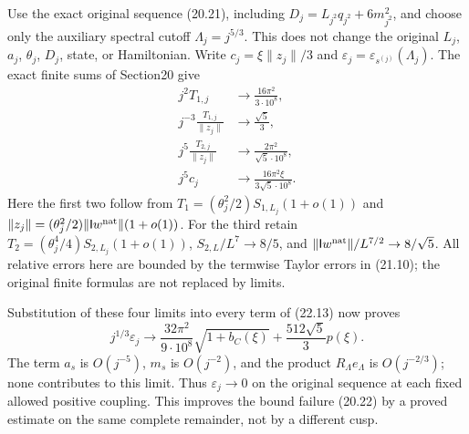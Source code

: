 \documentclass[
]{article}
\begin{document}
Use the exact original sequence (20.21), including
\(D_j=L_{j^2}q_{j^2}+6m_{j^2}^2\), and choose only the auxiliary
spectral cutoff \(\Lambda_j=j^{5/3}\). This does not change the original
\(L_j\), \(a_j\), \(\theta_j\), \(D_j\), state, or Hamiltonian. Write
\(c_j=\xi\|z_j\|/3\) and
\(\varepsilon_j=\varepsilon_{s^{(j)}}(\Lambda_j)\). The exact finite
sums of Section20 give \[
\begin{aligned}
j^2T_{1,j}&\longrightarrow\frac{16\pi^2}{3\cdot10^8},\\
j^{-3}\frac{T_{1,j}}{\|z_j\|}&\longrightarrow\frac{\sqrt5}{3},\\
j^5\frac{T_{2,j}}{\|z_j\|}&\longrightarrow\frac{2\pi^2}{\sqrt5\cdot10^8},\\
j^5c_j&\longrightarrow\frac{16\pi^2\xi}{3\sqrt5\cdot10^8}.
\end{aligned}                                                   \tag{22.15}
\] Here the first two follow from
\(T_1=(\theta_j^2/2)S_{1,L_j}(1+o(1))\) and
\(\|z_j\|=(\theta_j^2/2)\|\mathsf Iw^{\rm nat}\|(1+o(1))\). For the
third retain \(T_2=(\theta_j^4/4)S_{2,L_j}(1+o(1))\),
\(S_{2,L}/L^7\to8/5\), and
\(\|\mathsf Iw^{\rm nat}\|/L^{7/2}\to8/\sqrt5\). All relative errors
here are bounded by the termwise Taylor errors in (21.10); the original
finite formulas are not replaced by limits.

Substitution of these four limits into every term of (22.13) now proves
\[
j^{1/3}\varepsilon_j\longrightarrow
\frac{32\pi^2}{9\cdot10^8}\sqrt{1+b_C(\xi)}
                     +\frac{512\sqrt5}{3}p(\xi).
                                                               \tag{22.16}
\] The term \(a_s\) is \(O(j^{-5})\), \(m_s\) is \(O(j^{-2})\), and the
product \(R_\Lambda e_\Lambda\) is \(O(j^{-2/3})\); none contributes to
this limit. Thus \(\varepsilon_j\to0\) on the original sequence at each
fixed allowed positive coupling. This improves the bound failure (20.22)
by a proved estimate on the same complete remainder, not by a different
cusp.
\end{document}
